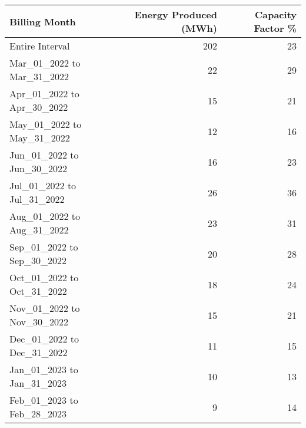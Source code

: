 \begin{tabular}{lrr}
\toprule
             Billing Month &  Energy Produced  (MWh) &  Capacity Factor \% \\
\midrule
           Entire Interval &                 202 &                 23 \\
Mar\_01\_2022 to Mar\_31\_2022 &                  22 &                 29 \\
Apr\_01\_2022 to Apr\_30\_2022 &                  15 &                 21 \\
May\_01\_2022 to May\_31\_2022 &                  12 &                 16 \\
Jun\_01\_2022 to Jun\_30\_2022 &                  16 &                 23 \\
Jul\_01\_2022 to Jul\_31\_2022 &                  26 &                 36 \\
Aug\_01\_2022 to Aug\_31\_2022 &                  23 &                 31 \\
Sep\_01\_2022 to Sep\_30\_2022 &                  20 &                 28 \\
Oct\_01\_2022 to Oct\_31\_2022 &                  18 &                 24 \\
Nov\_01\_2022 to Nov\_30\_2022 &                  15 &                 21 \\
Dec\_01\_2022 to Dec\_31\_2022 &                  11 &                 15 \\
Jan\_01\_2023 to Jan\_31\_2023 &                  10 &                 13 \\
Feb\_01\_2023 to Feb\_28\_2023 &                   9 &                 14 \\
\bottomrule
\end{tabular}
